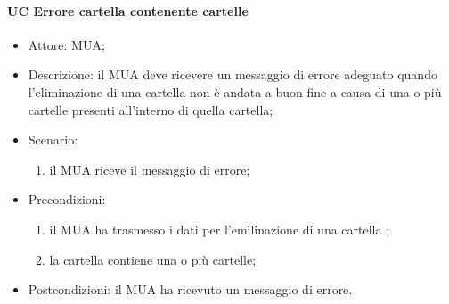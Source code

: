      \paragraph{UC Errore cartella contenente cartelle} \label{sec: UC 11.4.2.1}
     \begin{itemize}
         \item Attore: MUA;
         \item Descrizione: il MUA deve ricevere un messaggio di errore adeguato quando l'eliminazione di una cartella non è andata a buon fine a causa di una o più cartelle presenti all'interno di quella cartella;
         \item Scenario:
         \begin{enumerate}
         \item il MUA riceve il messaggio di errore;
         \end{enumerate}   
         \item Precondizioni: 
         \begin{enumerate}
             \item il MUA ha trasmesso i dati per l'emilinazione di una cartella ;
             \item la cartella contiene una o più cartelle;
         \end{enumerate}
         \item Postcondizioni: il MUA ha ricevuto un messaggio di errore.
     \end{itemize}
